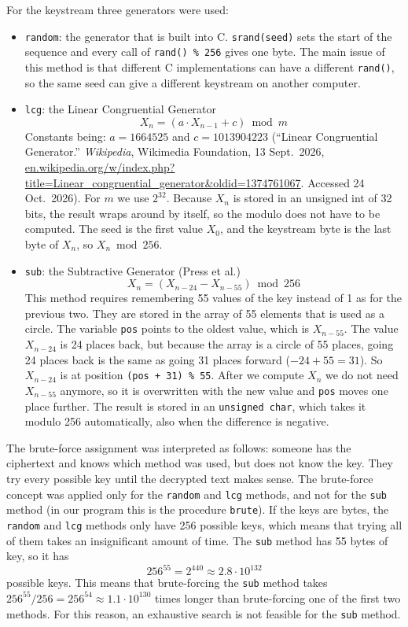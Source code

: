 \documentclass[a4paper,10pt]{article}
\begin{document}
For the keystream three generators were used:
\begin{itemize}
\item {\tt random}: the generator that is built into C. {\tt srand(seed)} sets the start of the sequence and every call of {\tt rand() \% 256} gives one byte. The main issue of this method is that different C implementations can have a different {\tt rand()}, so the same seed can give a different keystream on another computer.
\item {\tt lcg}: the Linear Congruential Generator
\begin{equation}\label{exprLCG}
X_n = (a \cdot X_{n-1} + c) \bmod m
\end{equation}
Constants being: $a = 1664525$ and $c = 1013904223$ (``Linear Congruential Generator.'' \emph{Wikipedia}, Wikimedia Foundation, 13 Sept.\ 2026, \url{en.wikipedia.org/w/index.php?title=Linear_congruential_generator&oldid=1374761067}. Accessed 24 Oct.\ 2026). For $m$ we use $2^{32}$. Because $X_n$ is stored in an unsigned int of 32 bits, the result wraps around by itself, so the modulo does not have to be computed. The seed is the first value $X_0$, and the keystream byte is the last byte of $X_n$, so $X_n \bmod 256$.
\item {\tt sub}: the Subtractive Generator (Press et al.)
\begin{equation}\label{exprSub}
X_n = (X_{n-24} - X_{n-55}) \bmod 256
\end{equation}
This method requires remembering 55 values of the key instead of 1 as for the previous two. They are stored in the array of 55 elements that is used as a circle. The variable {\tt pos} points to the oldest value, which is $X_{n-55}$. The value $X_{n-24}$ is 24 places back, but because the array is a circle of 55 places, going 24 places back is the same as going 31 places forward ($-24 + 55 = 31$). So $X_{n-24}$ is at position {\tt (pos + 31) \% 55}. After we compute $X_n$ we do not need $X_{n-55}$ anymore, so it is overwritten with the new value and {\tt pos} moves one place further. The result is stored in an {\tt unsigned char}, which takes it modulo 256 automatically, also when the difference is negative.
\end{itemize}
 
The brute-force assignment was interpreted as follows: someone has the ciphertext and knows which method was used, but does not know the key. They try every possible key until the decrypted text makes sense. The brute-force concept was applied only for the {\tt random} and {\tt lcg} methods, and not for the {\tt sub} method (in our program this is the procedure {\tt brute}). If the keys are bytes, the {\tt random} and {\tt lcg} methods only have 256 possible keys, which means that trying all of them takes an insignificant amount of time. The {\tt sub} method has 55 bytes of key, so it has
$$256^{55} = 2^{440} \approx 2.8 \cdot 10^{132}$$
possible keys. This means that brute-forcing the {\tt sub} method takes $256^{55} / 256 = 256^{54} \approx 1.1 \cdot 10^{130}$ times longer than brute-forcing one of the first two methods. For this reason, an exhaustive search is not feasible for the {\tt sub} method.
\end{document}
